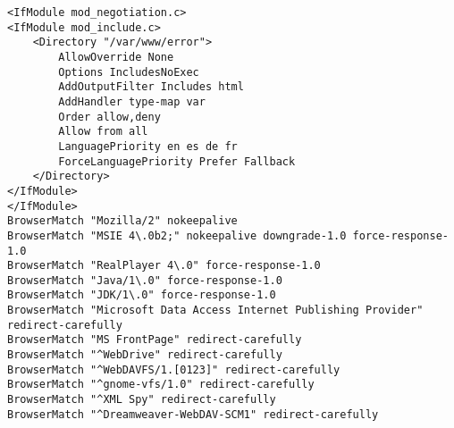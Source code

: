\begin{code}
\begin{lstlisting}
<IfModule mod_negotiation.c>
<IfModule mod_include.c>
    <Directory "/var/www/error">
        AllowOverride None
        Options IncludesNoExec
        AddOutputFilter Includes html
        AddHandler type-map var
        Order allow,deny
        Allow from all
        LanguagePriority en es de fr
        ForceLanguagePriority Prefer Fallback
    </Directory>
</IfModule>
</IfModule>
BrowserMatch "Mozilla/2" nokeepalive
BrowserMatch "MSIE 4\.0b2;" nokeepalive downgrade-1.0 force-response-1.0
BrowserMatch "RealPlayer 4\.0" force-response-1.0
BrowserMatch "Java/1\.0" force-response-1.0
BrowserMatch "JDK/1\.0" force-response-1.0
BrowserMatch "Microsoft Data Access Internet Publishing Provider" redirect-carefully
BrowserMatch "MS FrontPage" redirect-carefully
BrowserMatch "^WebDrive" redirect-carefully
BrowserMatch "^WebDAVFS/1.[0123]" redirect-carefully
BrowserMatch "^gnome-vfs/1.0" redirect-carefully
BrowserMatch "^XML Spy" redirect-carefully
BrowserMatch "^Dreamweaver-WebDAV-SCM1" redirect-carefully
\end{lstlisting}
\end{code}
